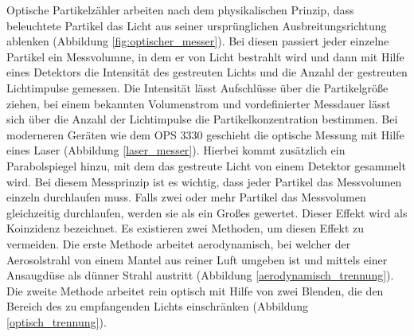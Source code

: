Optische Partikelz\"{a}hler arbeiten nach dem physikalischen Prinzip, dass beleuchtete Partikel das Licht aus seiner urspr\"{u}nglichen Ausbreitungsrichtung ablenken (Abbildung \ref{fig:optischer_messer}). Bei diesen passiert jeder einzelne Partikel ein Messvolumne, in dem er von Licht bestrahlt wird und dann mit Hilfe eines Detektors die Intensit\"{a}t des gestreuten Lichts und die Anzahl der gestreuten Lichtimpulse gemessen. Die Intensit\"{a}t l\"{a}sst Aufschl\"{u}sse \"{u}ber die Partikelgr\"{o}{\ss}e ziehen, bei einem bekannten Volumenstrom und vordefinierter Messdauer l\"{a}sst sich \"{u}ber die Anzahl der Lichtimpulse die Partikelkonzentration bestimmen. Bei moderneren Ger\"{a}ten wie dem OPS 3330 geschieht die optische Messung mit Hilfe eines Laser (Abbildung \ref{laser_messer}). Hierbei kommt zus\"{a}tzlich ein Parabolspiegel hinzu, mit dem das gestreute Licht von einem Detektor gesammelt wird. Bei diesem Messprinzip ist es wichtig, dass jeder Partikel das Messvolumen einzeln durchlaufen muss. Falls zwei oder mehr Partikel das Messvolumen gleichzeitig durchlaufen, werden sie als ein Gro{\ss}es gewertet. Dieser Effekt wird als Koinzidenz bezeichnet. Es existieren zwei Methoden, um diesen Effekt zu vermeiden. Die erste Methode arbeitet aerodynamisch, bei welcher der Aerosolstrahl von einem Mantel aus reiner Luft umgeben ist und mittels einer Ansaugd\"{u}se als d\"{u}nner Strahl austritt (Abbildung \ref{aerodynamisch_trennung}).\\
Die zweite Methode arbeitet rein optisch mit Hilfe von zwei Blenden, die den Bereich des zu empfangenden Lichts einschr\"{a}nken (Abbildung \ref{optisch_trennung}).

